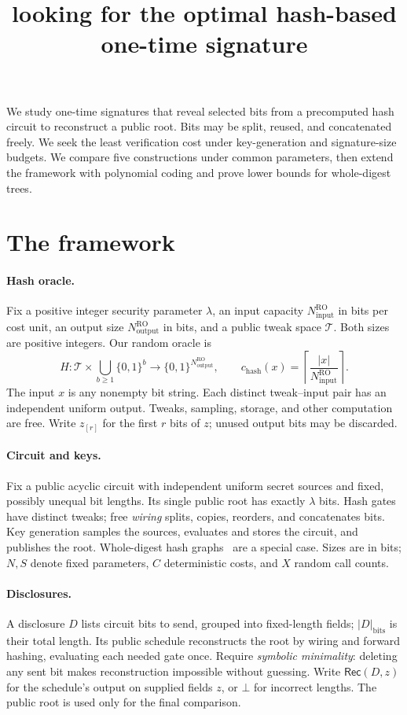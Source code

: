 \documentclass[10pt]{article}
\title{looking for the optimal hash-based one-time signature}
\author{}
\date{}
\newcommand{\roinput}{N_{\mathrm{input}}^{\mathrm{RO}}}
\newcommand{\rooutput}{N_{\mathrm{output}}^{\mathrm{RO}}}
\newcommand{\hashcost}{c_{\mathrm{hash}}}
\begin{document}
\maketitle
\vspace{-2em}

We study one-time signatures that reveal selected bits from a precomputed hash circuit to reconstruct a public root. Bits may be split, reused, and concatenated freely. We seek the least verification cost under key-generation and signature-size budgets. We compare five constructions under common parameters, then extend the framework with polynomial coding and prove lower bounds for whole-digest trees.

\section{The framework}
\paragraph{Hash oracle.} Fix a positive integer security parameter $\lambda$, an input capacity $\roinput$ in bits per cost unit, an output size $\rooutput$ in bits, and a public tweak space $\mathcal T$. Both sizes are positive integers. Our random oracle is
\[
 H:\mathcal T\times\bigcup_{b\ge1}\{0,1\}^{b}\longrightarrow\{0,1\}^{\rooutput},\qquad \hashcost(x)=\left\lceil\frac{|x|}{\roinput}\right\rceil.
\]
The input $x$ is any nonempty bit string. Each distinct tweak--input pair has an independent uniform output. Tweaks, sampling, storage, and other computation are free. Write $z_{[r]}$ for the first $r$ bits of $z$; unused output bits may be discarded.

\paragraph{Circuit and keys.} Fix a public acyclic circuit with independent uniform secret sources and fixed, possibly unequal bit lengths. Its single public root has exactly $\lambda$ bits. Hash gates have distinct tweaks; free \emph{wiring} splits, copies, reorders, and concatenates bits. Key generation samples the sources, evaluates and stores the circuit, and publishes the root. Whole-digest hash graphs~\cite{BM94} are a special case. Sizes are in bits; $N,S$ denote fixed parameters, $C$ deterministic costs, and $X$ random call counts.

\paragraph{Disclosures.} A disclosure $D$ lists circuit bits to send, grouped into fixed-length fields; $|D|_{\mathrm{bits}}$ is their total length. Its public schedule reconstructs the root by wiring and forward hashing, evaluating each needed gate once. Require \emph{symbolic minimality}: deleting any sent bit makes reconstruction impossible without guessing. Write $\mathsf{Rec}(D,z)$ for the schedule's output on supplied fields $z$, or $\bot$ for incorrect lengths. The public root is used only for the final comparison.
\end{document}
